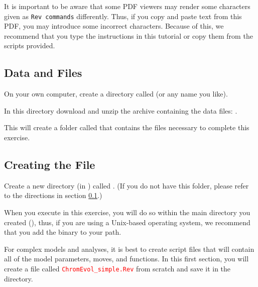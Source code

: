 It is important to be aware that some PDF viewers may render some characters given as \colorbox{shadecolor}{\tt{Rev commands}} differently. 
Thus, if you copy and paste text from this PDF, you may introduce some incorrect characters. 
Because of this, we recommend that you type the instructions in this tutorial or copy them from the scripts provided. 


\medskip
\subsection{Data and Files}\label{subsect:Exercise-DataFiles}

{\begin{framed}
On your own computer, create a directory called {\textcolor{red}{}} (or any name you like). 

In this directory download and unzip the archive containing the data files: \href{http://rawgit.com/revbayes/revbayes_tutorial/master/RB_Chromosome_Evolution_Tutorial/data.zip}{}.

This will create a folder called  that contains the files necessary to complete this exercise.

\end{framed}}


\bigskip
\subsection{Creating the \Rev File}\label{subsect:Exercise-CreatingFiles}

{\begin{framed}
Create a new directory (in ) called {\textcolor{red}{}}. (If you do not have this folder, please refer to the directions in section \ref{subsect:Exercise-DataFiles}.)
\end{framed}}

When you execute \RevBayes in this exercise, you will do so within the main directory you created (), thus, if you are using a Unix-based operating system, we recommend that you add the \RevBayes binary to your path.
\bigskip

For complex models and analyses, it is best to create \Rev script files that will contain all of the model parameters, moves, and functions. 
In this first section, you will create a file called \textcolor{red}{\texttt{ChromEvol\_simple.Rev}} from scratch and save it in the  directory.

